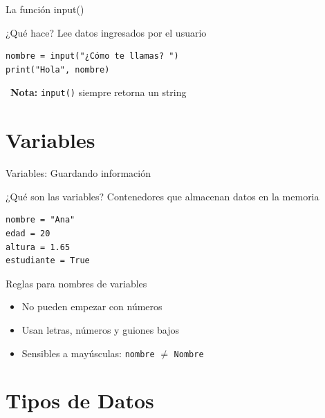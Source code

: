 \documentclass{beamer}
\begin{document}
\begin{frame}[fragile]{La función input() \ \faKeyboard}

\begin{conceptbox}{¿Qué hace?}
Lee datos ingresados por el usuario
\end{conceptbox}

\vspace{-0.2cm}
\begin{lstlisting}
nombre = input("¿Cómo te llamas? ")
print("Hola", nombre)
\end{lstlisting}

\vspace{0.2cm}
\begin{notebox}
\small\faExclamationTriangle \ \textbf{Nota:} \texttt{input()} siempre retorna un string
\end{notebox}
\end{frame}

\section{Variables}

\begin{frame}[fragile]{Variables: Guardando información \ \faDatabase}

\begin{conceptbox}{¿Qué son las variables?}
Contenedores que almacenan datos en la memoria
\end{conceptbox}

\vspace{-0.2cm}
\begin{lstlisting}
nombre = "Ana"
edad = 20
altura = 1.65
estudiante = True
\end{lstlisting}

\vspace{-0.1cm}
\begin{block}{Reglas para nombres de variables}
\small
\begin{itemize}
    \item[\faTimes] No pueden empezar con números
    \item[\faCheck] Usan letras, números y guiones bajos
    \item[\faExclamation] Sensibles a mayúsculas: \texttt{nombre} $\neq$ \texttt{Nombre}
\end{itemize}
\end{block}
\end{frame}

\section{Tipos de Datos}
\end{document}

